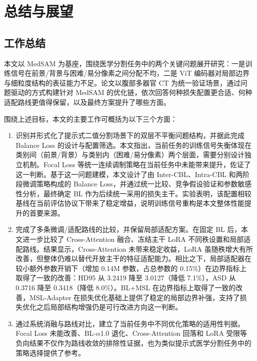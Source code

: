\chapter{总结与展望}

\section{工作总结}

本文以 MedSAM 为基座，围绕医学分割任务中的两个关键问题展开研究：一是训练信号在前景/背景与困难/易分像素之间分配不均，二是 ViT 编码器对局部边界与细粒度结构的表征能力不足。论文以腹部多器官 CT 为统一验证场景，通过问题驱动的方式构建针对 MedSAM 的优化链，依次回答何种损失配置更合适、何种适配路线更值得保留，以及最终方案提升了哪些方面。

围绕上述目标，本文的主要工作可概括为以下三个方面：

\begin{enumerate}
  \item 识别并形式化了提示式二值分割场景下的双层不平衡问题结构，并据此完成 Balance Loss 的设计与配置筛选。本文指出，当前任务的训练信号失衡体现在类别间（前景/背景）与类别内（困难/易分像素）两个层面，需要分别设计独立机制。Focal Loss 等统一连续调制策略在当前任务中未能带来提升，佐证了这一判断。基于这一问题建模，本文设计了由 Inter-CBL、Intra-CBL 和两阶段微调策略构成的 Balance Loss，并通过统一比较、竞争假设验证和参数敏感性分析，最终确定 BL 作为后续统一采用的损失主干。实验表明，该配置相较基线在当前评估协议下带来了稳定增益，说明训练信号重构是本文整体性能提升的首要来源。

  \item 完成了多条微调/适配路线的比较，并保留局部适配方案。在固定 BL 后，本文进一步比较了 Cross-Attention 融合、冻结主干 LoRA 不同秩设置和局部适配路线。结果显示，Cross-Attention 未带来稳定收益，LoRA 虽随秩增大有所改善，但整体仍难以替代开放主干的特征适配能力。相比之下，局部适配器在较小额外参数开销下（增加 0.14M 参数，占总参数的 0.15\%）在边界指标上取得了一致的改善：HD95 从 3.2419 降至 3.0127（降低 7.1\%），ASD 从 0.3716 降至 0.3418（降低 8.0\%）。BL+MSL 在边界指标上取得了一致的改善，MSL-Adapter 在损失优化基础上提供了稳定的局部边界补强，支持了损失优化之后局部结构增强仍是可行改进方向这一判断。

  \item 通过系统消融与路线对比，建立了当前任务中不同优化策略的适用性判据。Focal Loss 未能改善、BL-$\alpha$1.0 退化、Cross-Attention 回落和 LoRA 受限等负向结果不仅作为路线收敛的排除性证据，也为类似提示式医学分割任务中的策略选择提供了参考。
\end{enumerate}

